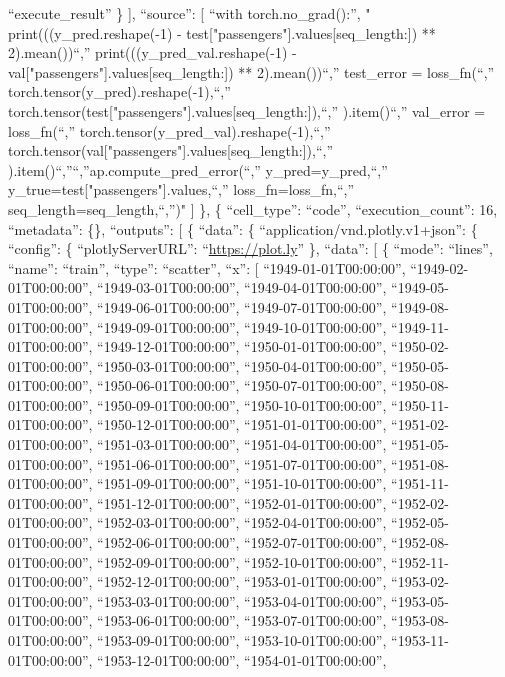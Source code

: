 \documentclass[
]{article}
\begin{document}
``execute\_result'' \} {]}, ``source'': {[} ``with
torch.no\_grad():\n'', " print(((y\_pred.reshape(-1) -
test{[}"passengers"{]}.values{[}seq\_length:{]}) ** 2).mean())\n``,''
print(((y\_pred\_val.reshape(-1) -
val{[}"passengers"{]}.values{[}seq\_length:{]}) ** 2).mean())\n``,''
test\_error = loss\_fn(\n``,'' torch.tensor(y\_pred).reshape(-1),\n``,''
torch.tensor(test{[}"passengers"{]}.values{[}seq\_length:{]}),\n``,''
).item()\n``,'' val\_error = loss\_fn(\n``,''
torch.tensor(y\_pred\_val).reshape(-1),\n``,''
torch.tensor(val{[}"passengers"{]}.values{[}seq\_length:{]}),\n``,''
).item()\n``,''\n``,''ap.compute\_pred\_error(\n``,''
y\_pred=y\_pred,\n``,'' y\_true=test{[}"passengers"{]}.values,\n``,''
loss\_fn=loss\_fn,\n``,'' seq\_length=seq\_length,\n``,'')\n" {]} \}, \{
``cell\_type'': ``code'', ``execution\_count'': 16, ``metadata'': \{\},
``outputs'': {[} \{ ``data'': \{ ``application/vnd.plotly.v1+json'': \{
``config'': \{ ``plotlyServerURL'': ``\url{https://plot.ly}'' \},
``data'': {[} \{ ``mode'': ``lines'', ``name'': ``train'', ``type'':
``scatter'', ``x'': {[} ``1949-01-01T00:00:00'',
``1949-02-01T00:00:00'', ``1949-03-01T00:00:00'',
``1949-04-01T00:00:00'', ``1949-05-01T00:00:00'',
``1949-06-01T00:00:00'', ``1949-07-01T00:00:00'',
``1949-08-01T00:00:00'', ``1949-09-01T00:00:00'',
``1949-10-01T00:00:00'', ``1949-11-01T00:00:00'',
``1949-12-01T00:00:00'', ``1950-01-01T00:00:00'',
``1950-02-01T00:00:00'', ``1950-03-01T00:00:00'',
``1950-04-01T00:00:00'', ``1950-05-01T00:00:00'',
``1950-06-01T00:00:00'', ``1950-07-01T00:00:00'',
``1950-08-01T00:00:00'', ``1950-09-01T00:00:00'',
``1950-10-01T00:00:00'', ``1950-11-01T00:00:00'',
``1950-12-01T00:00:00'', ``1951-01-01T00:00:00'',
``1951-02-01T00:00:00'', ``1951-03-01T00:00:00'',
``1951-04-01T00:00:00'', ``1951-05-01T00:00:00'',
``1951-06-01T00:00:00'', ``1951-07-01T00:00:00'',
``1951-08-01T00:00:00'', ``1951-09-01T00:00:00'',
``1951-10-01T00:00:00'', ``1951-11-01T00:00:00'',
``1951-12-01T00:00:00'', ``1952-01-01T00:00:00'',
``1952-02-01T00:00:00'', ``1952-03-01T00:00:00'',
``1952-04-01T00:00:00'', ``1952-05-01T00:00:00'',
``1952-06-01T00:00:00'', ``1952-07-01T00:00:00'',
``1952-08-01T00:00:00'', ``1952-09-01T00:00:00'',
``1952-10-01T00:00:00'', ``1952-11-01T00:00:00'',
``1952-12-01T00:00:00'', ``1953-01-01T00:00:00'',
``1953-02-01T00:00:00'', ``1953-03-01T00:00:00'',
``1953-04-01T00:00:00'', ``1953-05-01T00:00:00'',
``1953-06-01T00:00:00'', ``1953-07-01T00:00:00'',
``1953-08-01T00:00:00'', ``1953-09-01T00:00:00'',
``1953-10-01T00:00:00'', ``1953-11-01T00:00:00'',
``1953-12-01T00:00:00'', ``1954-01-01T00:00:00'',
\end{document}
